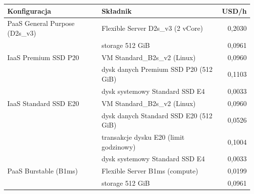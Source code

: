 \begin{tabular}{llr}
\toprule
Konfiguracja & Składnik & USD/h \\
\midrule
PaaS General Purpose (D2s\_v3) & Flexible Server D2s\_v3 (2 vCore) & 0,2030 \\
 & storage 512 GiB & 0,0961 \\
IaaS Premium SSD P20 & VM Standard\_B2s\_v2 (Linux) & 0,0960 \\
 & dysk danych Premium SSD P20 (512 GiB) & 0,1103 \\
 & dysk systemowy Standard SSD E4 & 0,0033 \\
IaaS Standard SSD E20 & VM Standard\_B2s\_v2 (Linux) & 0,0960 \\
 & dysk danych Standard SSD E20 (512 GiB) & 0,0526 \\
 & transakcje dysku E20 (limit godzinowy) & 0,1004 \\
 & dysk systemowy Standard SSD E4 & 0,0033 \\
PaaS Burstable (B1ms) & Flexible Server B1ms (compute) & 0,0199 \\
 & storage 512 GiB & 0,0961 \\
\bottomrule
\end{tabular}
